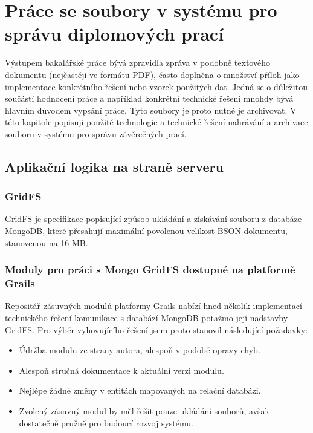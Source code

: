 \chapter{Práce se soubory v systému pro správu diplomových prací}
Výstupem bakalářské práce bývá zpravidla zpráva v podobně textového dokumentu (nejčastěji ve formátu PDF), často doplněna o množství příloh jako implementace konkrétního řešení nebo vzorek použitých dat. Jedná se o důležitou součástí hodnocení práce a například konkrétní technické řešení mnohdy bývá hlavním důvodem vypsání práce. Tyto soubory je proto nutné je archivovat. V této kapitole popisuji použité technologie a technické řešení nahrávání a archivace souboru v systému pro správu závěrečných prací.

\section{Aplikační logika na straně serveru}
\blindtext[2]

\subsection{GridFS}
GridFS je specifikace popisující způsob ukládání a získávání souboru z databáze MongoDB, které přesahují maximální povolenou velikost BSON dokumentu, stanovenou na 16 MB.
\blindtext[1]

\subsection{Moduly pro práci s Mongo GridFS dostupné na platformě Grails}
Repositář zásuvných modulů platformy Grails nabízí hned několik implementací technického řešení komunikace s databází MongoDB potažmo její nadstavby GridFS. Pro výběr vyhovujícího řešení jsem proto stanovil následující požadavky:

\begin{itemize}
\item Údržba modulu ze strany autora, alespoň v podobě opravy chyb.
\item Alespoň stručná dokumentace k aktuální verzi modulu.
\item Nejlépe žádné změny v entitách mapovaných na relační databázi.
\item Zvolený zásuvný modul by měl řešit pouze ukládání souborů, avšak dostatečně pružně pro budoucí rozvoj systému.
\end{itemize}

